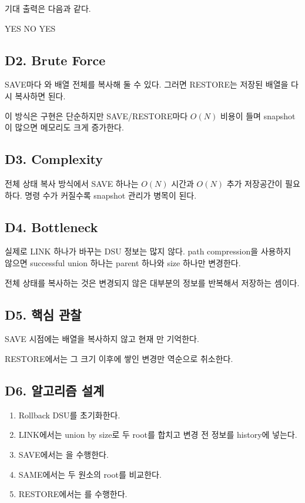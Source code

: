 기대 출력은 다음과 같다.
\begin{TextBlock}
YES
NO
YES
\end{TextBlock}

\subsection*{D2. Brute Force}
SAVE마다 와  배열 전체를 복사해 둘 수 있다. 그러면 RESTORE는 저장된 배열을 다시 복사하면 된다.

이 방식은 구현은 단순하지만 SAVE/RESTORE마다 $O(N)$ 비용이 들며 snapshot이 많으면 메모리도 크게 증가한다.

\subsection*{D3. Complexity}
전체 상태 복사 방식에서 SAVE 하나는 $O(N)$ 시간과 $O(N)$ 추가 저장공간이 필요하다. 명령 수가 커질수록 snapshot 관리가 병목이 된다.

\subsection*{D4. Bottleneck}
실제로 LINK 하나가 바꾸는 DSU 정보는 많지 않다. path compression을 사용하지 않으면 successful union 하나는 parent 하나와 size 하나만 변경한다.

전체 상태를 복사하는 것은 변경되지 않은 대부분의 정보를 반복해서 저장하는 셈이다.

\subsection*{D5. 핵심 관찰}
SAVE 시점에는 배열을 복사하지 않고 현재 만 기억한다.

RESTORE에서는 그 크기 이후에 쌓인 변경만 역순으로 취소한다.

\subsection*{D6. 알고리즘 설계}
\begin{enumerate}
\item Rollback DSU를 초기화한다.
\item LINK에서는 union by size로 두 root를 합치고 변경 전 정보를 history에 넣는다.
\item SAVE에서는 을 수행한다.
\item SAME에서는 두 원소의 root를 비교한다.
\item RESTORE에서는 를 수행한다.
\end{enumerate}

